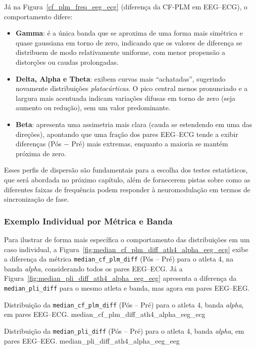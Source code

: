 Já na Figura~\ref{cf_plm_freq_eeg_ecg} (diferença da CF-PLM em EEG--ECG), o comportamento difere:
\begin{itemize}
    \item \textbf{Gamma}: é a única banda que se aproxima de uma forma mais simétrica e quase gaussiana em torno de zero, indicando que os valores de diferença se distribuem de modo relativamente uniforme, com menor propensão a distorções ou caudas prolongadas.
    \item \textbf{Delta, Alpha e Theta}: exibem curvas mais “achatadas”, sugerindo novamente distribuições \emph{platocúrticas}. O pico central menos pronunciado e a largura mais acentuada indicam variações difusas em torno de zero (seja aumento ou redução), sem um valor predominante.
    \item \textbf{Beta}: apresenta uma assimetria mais clara (cauda se estendendo em uma das direções), apontando que uma fração dos pares EEG--ECG tende a exibir diferenças (Pós $-$ Pré) mais extremas, enquanto a maioria se mantém próxima de zero.
\end{itemize}

Esses perfis de dispersão são fundamentais para a escolha dos testes estatísticos, que será abordada no próximo capítulo, além de fornecerem pistas sobre como as diferentes faixas de frequência podem responder à neuromodulação em termos de sincronização de fase.

\subsubsection{Exemplo Individual por Métrica e Banda}
Para ilustrar de forma mais específica o comportamento das distribuições em um caso individual, a Figura~\ref{fig:median_cf_plm_diff_ath4_alpha_eeg_ecg} exibe a diferença da métrica \texttt{median\_cf\_plm\_diff} (Pós -- Pré) para o atleta 4, na banda \emph{alpha}, considerando todos os pares EEG--ECG. Já a Figura~\ref{fig:median_pli_diff_ath4_alpha_eeg_eeg} apresenta a diferença da \texttt{median\_pli\_diff} para o mesmo atleta e banda, mas agora em pares EEG--EEG.

{Distribuição da \texttt{median\_cf\_plm\_diff} (Pós -- Pré) para o atleta 4, banda \emph{alpha}, em pares EEG--ECG.}
{median_cf_plm_diff_ath4_alpha_eeg_ecg}

{Distribuição da \texttt{median\_pli\_diff} (Pós -- Pré) para o atleta 4, banda \emph{alpha}, em pares EEG--EEG.}
{median_pli_diff_ath4_alpha_eeg_eeg}

